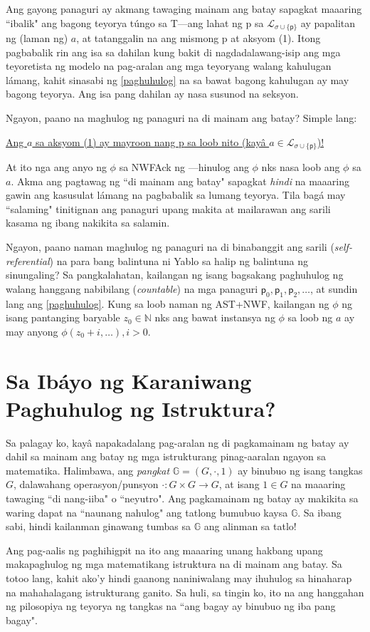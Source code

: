 \documentclass{article}
\begin{document}
Ang gayong panaguri ay akmang tawaging mainam ang batay sapagkat maaaring ``ibalik" ang bagong teyorya túngo sa \textsf{T}---ang lahat ng \textsf{p} sa $\mathcal{L}_{\sigma \cup \{\textsf{p}\}}$ ay papalitan ng (laman ng) $a$, at tatanggalin na ang mismong \textsf{p} at aksyom (1). Itong pagbabalik rin ang isa sa dahilan kung bakit di nagdadalawang-isip ang mga teyoretista ng modelo na pag-aralan ang mga teyoryang walang kahulugan lámang, kahit sinasabi ng \ref{paghuhulog} na sa bawat bagong kahulugan ay may bagong teyorya. Ang isa pang dahilan ay nasa susunod na seksyon.

Ngayon, paano na maghulog ng panaguri na di mainam ang batay? Simple lang:

\centerline{\underline{Ang $a$ sa aksyom (1) ay mayroon nang \textsf{p} sa loob nito (kayâ $a \in \mathcal{L}_{\sigma \cup \{\textsf{p}\}}$)!}}

At ito nga ang anyo ng $\phi$ sa \textsf{NWFAck} ng \cite{ast-nwf}---hinulog ang $\phi$ nks nasa loob ang $\phi$ sa $a$. Akma ang pagtawag ng ``di mainam ang batay" sapagkat \textit{hindi} na maaaring gawin ang kasusulat lámang na pagbabalik sa lumang teyorya. Tila bagá may ``salaming" tinitignan ang panaguri upang makita at mailarawan ang sarili kasama ng ibang nakikita sa salamin.

Ngayon, paano naman maghulog ng panaguri na di binabanggit ang sarili (\textit{self-referential}) na para bang balintuna ni Yablo\cite{yablo} sa halip ng balintuna ng sinungaling? Sa pangkalahatan, kailangan ng isang bagsakang paghuhulog ng walang hanggang nabibilang (\textit{countable}) na mga panaguri $\textsf{p}_{0}, \textsf{p}_{1}, \textsf{p}_{2}, \ldots$, at sundin lang ang \ref{paghuhulog}. Kung sa loob naman ng \textsf{AST+NWF}, kailangan ng $\phi$ ng isang pantanging baryable $z_0\in\mathbb{N}$ nks ang bawat instansya ng $\phi$ sa loob ng $a$ ay may anyong $\phi(z_0 + i, \ldots), i > 0.$

\section{Sa Ibáyo ng Karaniwang Paghuhulog ng Istruktura?}

Sa palagay ko, kayâ napakadalang pag-aralan ng di pagkamainam ng batay ay dahil sa mainam ang batay ng mga istrukturang pinag-aaralan ngayon sa matematika. Halimbawa, ang \textit{pangkat} $\mathbb{G} = (G, \cdot, 1)$ ay binubuo ng isang tangkas $G$, dalawahang operasyon/punsyon $\cdot:G \times G \rightarrow G$, at isang $1 \in G$ na maaaring tawaging ``di nang-iiba" o ``neyutro". Ang pagkamainam ng batay ay makikita sa waring dapat na ``naunang nahulog" ang tatlong bumubuo kaysa $\mathbb{G}$. Sa ibang sabi, hindi kailanman ginawang tumbas sa $\mathbb{G}$ ang alinman sa tatlo!

Ang pag-aalis ng paghihigpit na ito ang maaaring unang hakbang upang makapaghulog ng mga matematikang istruktura na di mainam ang batay. Sa totoo lang, kahit ako'y hindi gaanong naniniwalang may ihuhulog sa hinaharap na mahahalagang istrukturang ganito. Sa huli, sa tingin ko, ito na ang hanggahan ng pilosopiya ng teyorya ng tangkas na ``ang bagay ay binubuo ng iba pang bagay". 



\end{document}
